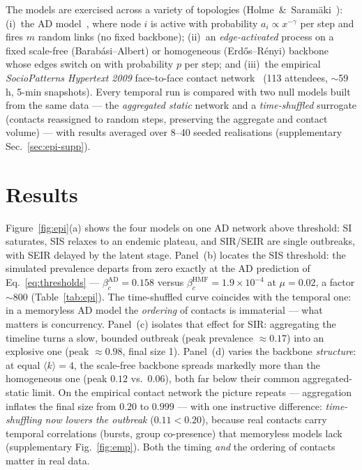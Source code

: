 The models are exercised across a variety of topologies
(Holme~\&~Saram\"aki~\cite{holme2012temporal}): (i)~the AD
model~\cite{perra2012activity}, where node $i$ is active with probability
$a_i\propto x^{-\gamma}$ per step and fires $m$ random links (no fixed
backbone); (ii)~an \emph{edge-activated} process on a fixed scale-free
(Barab\'asi--Albert) or homogeneous (Erd\H{o}s--R\'enyi) backbone whose edges
switch on with probability $p$ per step; and (iii)~the empirical
\emph{SocioPatterns Hypertext 2009} face-to-face contact
network~\cite{isella2011whats} (113 attendees, $\sim$59 h, 5-min snapshots).
Every temporal run is compared with two null models built from the same data
--- the \emph{aggregated static} network and a \emph{time-shuffled} surrogate
(contacts reassigned to random steps, preserving the aggregate and contact
volume) --- with results averaged over 8--40 seeded realisations
(supplementary Sec.~\ref{sec:epi-supp}).

\section{Results}

Figure~\ref{fig:epi}(a) shows the four models on one AD network above
threshold: SI saturates, SIS relaxes to an endemic plateau, and SIR/SEIR are
single outbreaks, with SEIR delayed by the latent stage. Panel~(b) locates the
SIS threshold: the simulated prevalence departs from zero exactly at the AD
prediction of Eq.~\eqref{eq:thresholds} --- $\beta_c^{\mathrm{AD}}=0.158$
versus $\beta_c^{\mathrm{HMF}}=1.9\times10^{-4}$ at $\mu=0.02$, a factor
$\sim$800 (Table~\ref{tab:epi}). The time-shuffled curve coincides with the
temporal one: in a memoryless AD model the \emph{ordering} of contacts is
immaterial --- what matters is concurrency. Panel~(c) isolates that effect for
SIR: aggregating the timeline turns a slow, bounded outbreak (peak prevalence
$\approx0.17$) into an explosive one (peak $\approx0.98$, final size 1).
Panel~(d) varies the backbone \emph{structure}: at equal
$\langle k\rangle=4$, the scale-free backbone spreads markedly more than the
homogeneous one (peak $0.12$ vs.\ $0.06$), both far below their common
aggregated-static limit. On the empirical contact network the picture repeats
--- aggregation inflates the final size from $0.20$ to $0.999$ --- with one
instructive difference: \emph{time-shuffling now lowers the outbreak}
($0.11<0.20$), because real contacts carry temporal correlations (bursts,
group co-presence) that memoryless models lack
(supplementary Fig.~\ref{fig:emp}). Both the timing \emph{and} the ordering
of contacts matter in real data.

